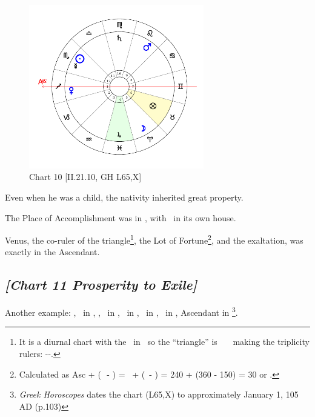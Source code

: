 \clearpage
\begin{figure}
\centering
\vspace{-20pt}
\includegraphics[width=0.68\textwidth]{charts/2_21_10}
\caption{Chart 10 [II.21.10, GH L65,X]}
\label{fig:chart10}
\end{figure}

Even when he was a child, the nativity inherited great property. 

The Place of Accomplishment was in \Pisces, with \Jupiter\, in its own house. 

Venus, the co-ruler of the triangle\footnote{It is a diurnal chart with the \Sun\, in \Scorpio\, so the ``triangle'' is \Cancer\, \Scorpio\, \Pisces\, making the triplicity rulers: \Venus-\Mars-\Moon.}, the Lot of Fortune\footnote{Calculated as Asc + (\Moon\,\, - \Sun) = \Sagittarius\, + (\Aries\, - \Virgo) = 240 + (360 - 150) = 30 or \Taurus.}, and the exaltation, was exactly in the Ascendant.
\clearpage

\newpage
\subsection*{\textit{[Chart 11 Prosperity to Exile]}}

Another example: \Sun, \Mercury\, in \Capricorn, \Moon, \Saturn\, in \Sagittarius, \Jupiter\, in \Cancer, \Mars\, in \Virgo, \Venus\, in \Aquarius, Ascendant in \Libra
\footnote{\textit{Greek Horoscopes} dates the chart (L65,X) to approximately January 1, 105 AD (p.103)}.


